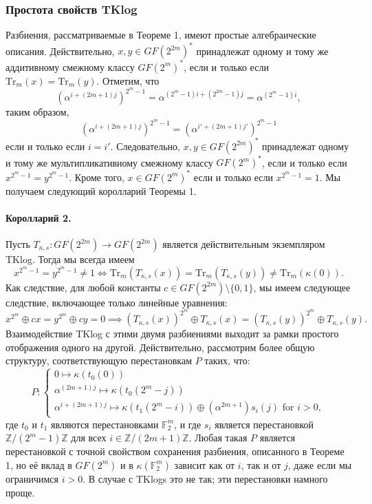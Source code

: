 \subsubsection{Простота свойств TKlog}
Разбиения, рассматриваемые в Теореме 1, имеют простые алгебраические описания. Действительно,
\( x, y \in GF(2^{2m})^{\ast} \) принадлежат одному и тому же аддитивному смежному классу \( GF(2^m)^{\ast} \), если и только если \( \text{Tr}_m(x) = \text{Tr}_m(y) \).
Отметим, что
\[
\left(\alpha^{i+(2m+1)j}\right)^{2^m-1} = \alpha^{(2^m-1)i+(2^{2m}-1)j} = \alpha^{(2^m-1)i},
\]
таким образом,
\[
\left(\alpha^{i+(2m+1)j}\right)^{2^m-1} = \left(\alpha^{i'+(2m+1)j'}\right)^{2^m-1}
\]
если и только если \( i = i' \). Следовательно, \( x, y \in GF(2^{2m})^{\ast} \) принадлежат одному и тому же мультипликативному смежному классу \( GF(2^m)^{\ast} \), если и только если \( x^{2^m-1} = y^{2^m-1} \).
Кроме того, \( x \in GF(2^m)^{\ast} \) если и только если \( x^{2^m-1} = 1 \). Мы получаем следующий королларий Теоремы 1.

\paragraph{Королларий 2.} Пусть \( T_{\kappa,s} : GF(2^{2m}) \to GF(2^{2m}) \) является действительным экземпляром TKlog. Тогда мы всегда имеем
\[
x^{2^m-1} = y^{2^m-1} \neq 1 \Leftrightarrow \text{Tr}_m(T_{\kappa,s}(x)) = \text{Tr}_m(T_{\kappa,s}(y)) \neq \text{Tr}_m(\kappa(0)).
\]
Как следствие, для любой константы \( c \in GF(2^{2m}) \setminus \{0, 1\} \), мы имеем следующее следствие, включающее только линейные уравнения:
\[
x^{2^m} \oplus cx = y^{2^m} \oplus cy = 0 \implies (T_{\kappa,s}(x))^{2^m} \oplus T_{\kappa,s}(x) = (T_{\kappa,s}(y))^{2^m} \oplus T_{\kappa,s}(y).
\]
Взаимодействие TKlog с этими двумя разбиениями выходит за рамки простого отображения одного на другой. Действительно, рассмотрим более общую структуру, соответствующую перестановкам \( P \) таких, что:
\[
P :
\begin{cases}
0 \mapsto \kappa (t_0(0)) \\
\alpha^{(2m+1)j} \mapsto \kappa (t_0(2^m - j)) \\
\alpha^{i+(2m+1)j} \mapsto \kappa (t_1(2^m - i)) \oplus (\alpha^{2m+1}) s_i(j) \text{ for } i > 0,
\end{cases}
\]
где \( t_0 \) и \( t_1 \) являются перестановками \( \mathbb{F}_{2}^{m} \), и где \( s_i \) является перестановкой \( \mathbb{Z}/(2^m - 1)\mathbb{Z} \) для всех \( i \in \mathbb{Z}/(2m + 1)\mathbb{Z} \). Любая такая \( P \) является перестановкой с точной свойством сохранения разбиения, описанного в Теореме 1, но её вклад в \( GF (2^m) \) и в \( \kappa(\mathbb{F}_{2}^{m}) \) зависит как от \( i \), так и от \( j \), даже если мы ограничимся \( i > 0 \). В случае с TKlogs это не так; эти перестановки намного проще.

